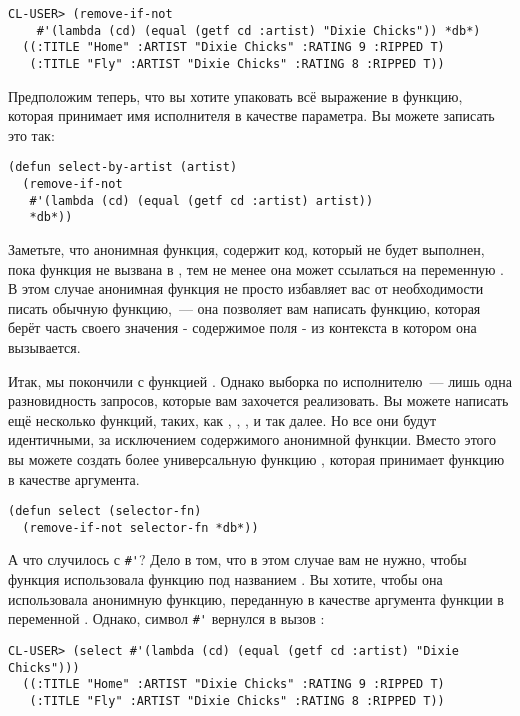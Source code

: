 \begin{lstlisting}[style=lisprepl]
  CL-USER> (remove-if-not
    #'(lambda (cd) (equal (getf cd :artist) "Dixie Chicks")) *db*)
  ((:TITLE "Home" :ARTIST "Dixie Chicks" :RATING 9 :RIPPED T)
   (:TITLE "Fly" :ARTIST "Dixie Chicks" :RATING 8 :RIPPED T))
\end{lstlisting}

Предположим теперь, что вы хотите упаковать всё выражение в функцию, которая принимает имя
исполнителя в качестве параметра. Вы можете записать это так:

\begin{lstlisting}
(defun select-by-artist (artist)
  (remove-if-not
   #'(lambda (cd) (equal (getf cd :artist) artist))
   *db*))
\end{lstlisting}

Заметьте, что анонимная функция, содержит код, который не будет выполнен, пока функция не
вызвана в , тем не менее она может ссылаться на переменную
. В этом случае анонимная функция не просто избавляет вас от необходимости
писать обычную функцию,~--- она позволяет вам написать функцию, которая берёт часть своего
значения - содержимое поля  - из контекста в котором она вызывается.

Итак, мы покончили с функцией . Однако выборка по исполнителю~---
лишь одна разновидность запросов, которые вам захочется реализовать. Вы можете написать
ещё несколько функций, таких, как , ,
, и так далее. Но все они будут идентичными, за
исключением содержимого анонимной функции. Вместо этого вы можете создать более
универсальную функцию , которая принимает функцию в качестве аргумента.

\begin{lstlisting}
(defun select (selector-fn)
  (remove-if-not selector-fn *db*))
\end{lstlisting}

А что случилось с \lstinline!#'!? Дело в том, что в этом случае вам не нужно, чтобы функция
 использовала функцию под названием . Вы хотите,
чтобы она использовала анонимную функцию, переданную в качестве аргумента функции
 в переменной . Однако, символ \lstinline!#'! вернулся в вызов
:

\begin{lstlisting}[style=lisprepl]
  CL-USER> (select #'(lambda (cd) (equal (getf cd :artist) "Dixie Chicks")))
  ((:TITLE "Home" :ARTIST "Dixie Chicks" :RATING 9 :RIPPED T)
   (:TITLE "Fly" :ARTIST "Dixie Chicks" :RATING 8 :RIPPED T))
\end{lstlisting}

